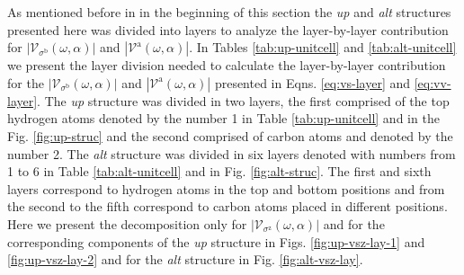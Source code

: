 \documentclass[prb,11pt,tightenlines,twocolumn,aps]{revtex4-1}
\begin{document}
As mentioned before in in the beginning of this section the \emph{up} and
\emph{alt} structures presented here was divided into layers to analyze the
layer-by-layer contribution for $|\mathcal{V}_{\sigma^{\mathrm{b}}}
(\omega,\alpha)|$ and $|\mathcal{V}^{\mathrm{a}} (\omega,\alpha)|$. 
% 
In Tables \ref{tab:up-unitcell} and \ref{tab:alt-unitcell} we present the layer
division needed to calculate the layer-by-layer contribution for the
$|\mathcal{V}_{\sigma^{\mathrm{b}}}(\omega,\alpha)|$ and
$|\mathcal{V}^{\mathrm{a}}(\omega,\alpha)|$ presented in Eqns.
\eqref{eq:vs-layer} and \eqref{eq:vv-layer}. The \emph{up} structure was
divided in two layers, the first comprised of the top hydrogen atoms denoted by
the number 1 in Table \ref{tab:up-unitcell} and in the Fig. \ref{fig:up-struc}
and the second comprised of carbon atoms and denoted by the number 2. The
\emph{alt} structure was divided in six layers denoted with numbers from 1 to 6
in Table \ref{tab:alt-unitcell} and in Fig. \ref{fig:alt-struc}. The first and
sixth layers correspond to hydrogen atoms in the top and bottom positions and
from the second to the fifth correspond to carbon atoms placed in different
positions.
% 
Here we present the decomposition only for $|\mathcal{V}_{\sigma^{\mathrm{z}}}
(\omega,\alpha)|$ and for the corresponding components of the \emph{up}
structure in Figs.
% 
\ref{fig:up-vsz-lay-1} and \ref{fig:up-vsz-lay-2} and for the \emph{alt}    
structure in Fig. \ref{fig:alt-vsz-lay}. 
% 
% 
\end{document}
